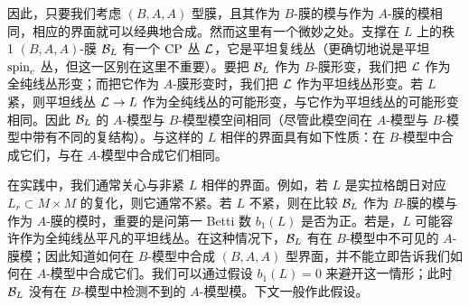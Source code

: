 因此，只要我们考虑 $(B,A,A)$ 型膜，且其作为 $B$-膜的模与作为 $A$-膜的模相同，相应的界面就可以经典地合成。然而这里有一个微妙之处。支撑在 $L$ 上的秩 1 $(B,A,A)$-膜 ${\mathcal B}_L$ 有一个 ${\mathrm{CP}}$ 丛 ${\mathcal L}$，它是平坦复线丛（更确切地说是平坦 ${\mathrm{spin}_c}$ 丛，但这一区别在这里不重要）。要把 ${\mathcal B}_L$ 作为 $B$-膜形变，我们把 ${\mathcal L}$ 作为全纯线丛形变；而把它作为 $A$-膜形变时，我们把 ${\mathcal L}$ 作为平坦线丛形变。若 $L$ 紧，则平坦线丛 ${\mathcal L}\to L$ 作为全纯线丛的可能形变，与它作为平坦线丛的可能形变相同。因此 ${\mathcal B}_L$ 的 $A$-模型与 $B$-模型模空间相同（尽管此模空间在 $A$-模型与 $B$-模型中带有不同的复结构）。与这样的 $L$ 相伴的界面具有如下性质：在 $B$-模型中合成它们，与在 $A$-模型中合成它们相同。

在实践中，我们通常关心与非紧 $L$ 相伴的界面。例如，若 $L$ 是实拉格朗日对应 $L_r\subset M\times M$ 的复化，则它通常不紧。若 $L$ 不紧，则在比较 ${\mathcal B}_L$ 作为 $B$-膜的模与作为 $A$-膜的模时，重要的是问第一 Betti 数 $b_1(L)$ 是否为正。若是，$L$ 可能容许作为全纯线丛平凡的平坦线丛。在这种情况下，${\mathcal B}_L$ 有在 $B$-模型中不可见的 $A$-膜模；因此知道如何在 $B$-模型中合成 $(B,A,A)$ 型界面，并不能立即告诉我们如何在 $A$-模型中合成它们。我们可以通过假设 $b_1(L)=0$ 来避开这一情形；此时 ${\mathcal B}_L$ 没有在 $B$-模型中检测不到的 $A$-模型模。下文一般作此假设。
